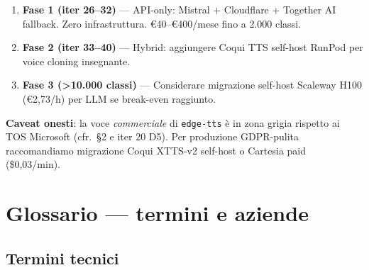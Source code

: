 \documentclass[12pt,a4paper]{article}
\begin{document}
\begin{enumerate}[leftmargin=*]
  \item \textbf{Fase 1 (iter 26--32)} --- API-only: Mistral + Cloudflare + Together AI fallback. Zero infrastruttura. €40--€400/mese fino a 2.000 classi.
  \item \textbf{Fase 2 (iter 33--40)} --- Hybrid: aggiungere Coqui TTS self-host RunPod per voice cloning insegnante.
  \item \textbf{Fase 3 (>10.000 classi)} --- Considerare migrazione self-host Scaleway H100 (€2,73/h) per LLM se break-even raggiunto.
\end{enumerate}

\textbf{Caveat onesti}: la voce \emph{commerciale} di \texttt{edge-tts} è in zona grigia rispetto ai TOS Microsoft (cfr.\ \S2 e iter 20 D5). Per produzione GDPR-pulita raccomandiamo migrazione Coqui XTTS-v2 self-host o Cartesia paid (\$0,03/min).

\newpage

\section{Glossario --- termini e aziende}

\subsection{Termini tecnici}
\end{document}
